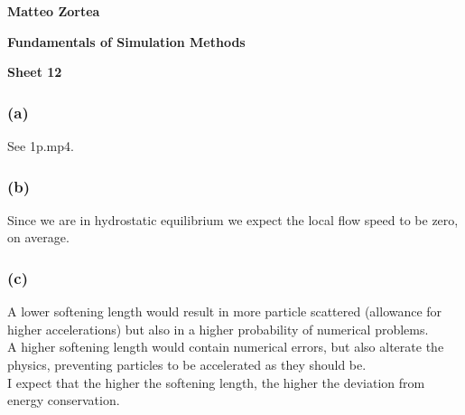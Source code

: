 \documentclass{article}
\begin{document}
\centerline{\Large\bfseries Matteo Zortea}
\vspace{10pt}
\centerline{\Large\bfseries Fundamentals of Simulation Methods}
\vspace{10pt}
\centerline{\Large\bfseries Sheet 12}
\vspace{30pt}

\subsubsection*{(a)}
See 1p.mp4.

\subsubsection*{(b)}
Since we are in hydrostatic equilibrium we expect the local flow speed to be zero, on average.

\subsubsection*{(c)}
A lower softening length would result in more particle scattered (allowance for higher accelerations) but also in a higher 
probability of numerical problems. \\
A higher softening length would contain numerical errors, but also alterate the physics, preventing particles to be accelerated as they should be. \\
I expect that the higher the softening length, the higher the deviation from energy conservation.
\end{document}
